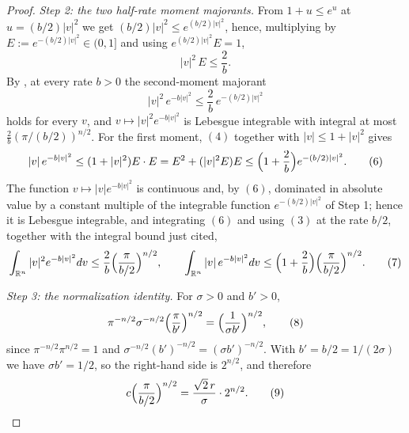 \begin{proof}
\emph{Step 2: the two half-rate moment majorants.}
From $1+u \leq e^u$ at $u = (b/2)|v|^2$ we get
$(b/2)|v|^2 \leq e^{(b/2)|v|^2}$, hence, multiplying by
$E := e^{-(b/2)|v|^2} \in (0,1]$ and using $e^{(b/2)|v|^2}E = 1$,
\begin{equation*}
  |v|^2\,E \leq \frac2b . \tag{4}
\end{equation*}
By , at every rate $b > 0$ the
second-moment majorant
\begin{equation*}
  |v|^2\,e^{-b|v|^2} \leq \frac2b\,e^{-(b/2)|v|^2} \tag{5}
\end{equation*}
holds for every $v$, and $v \mapsto |v|^2e^{-b|v|^2}$ is Lebesgue integrable with
integral at most $\frac2b(\pi/(b/2))^{n/2}$.  For the first moment, $(4)$ together
with $|v| \leq 1+|v|^2$ gives
\begin{equation*}
  |v|\,e^{-b|v|^2} \leq (1+|v|^2)E\cdot E = E^2 + (|v|^2E)E
    \leq \Bigl(1+\frac2b\Bigr)e^{-(b/2)|v|^2} . \tag{6}
\end{equation*}
The function $v \mapsto |v|e^{-b|v|^2}$ is continuous and, by $(6)$, dominated in
absolute value by a constant multiple of the integrable function $e^{-(b/2)|v|^2}$
of Step 1; hence it is Lebesgue integrable, and integrating $(6)$ and using $(3)$
at the rate $b/2$, together with the integral bound just cited,
\begin{equation*}
  \int_{\mathbb{R}^n}|v|^2e^{-b|v|^2}dv \leq \frac2b\Bigl(\frac{\pi}{b/2}\Bigr)^{n/2},
  \qquad
  \int_{\mathbb{R}^n}|v|\,e^{-b|v|^2}dv
    \leq \Bigl(1+\frac2b\Bigr)\Bigl(\frac{\pi}{b/2}\Bigr)^{n/2} . \tag{7}
\end{equation*}

\emph{Step 3: the normalization identity.}
For $\sigma > 0$ and $b' > 0$,
\begin{equation*}
  \pi^{-n/2}\sigma^{-n/2}\Bigl(\frac{\pi}{b'}\Bigr)^{n/2}
    = \Bigl(\frac{1}{\sigma b'}\Bigr)^{n/2} , \tag{8}
\end{equation*}
since $\pi^{-n/2}\pi^{n/2} = 1$ and $\sigma^{-n/2}(b')^{-n/2} = (\sigma b')^{-n/2}$.
With $b' = b/2 = 1/(2\sigma)$ we have $\sigma b' = 1/2$, so the right-hand side is
$2^{n/2}$, and therefore
\begin{equation*}
  c\Bigl(\frac{\pi}{b/2}\Bigr)^{n/2}
    = \frac{\sqrt2\,r}{\sigma}\cdot2^{n/2} . \tag{9}
\end{equation*}


\end{proof}
